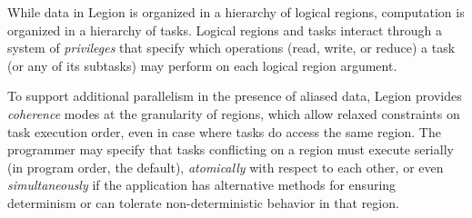 While data in Legion is organized in a hierarchy of logical regions,
computation is organized in a hierarchy of tasks.  Logical regions and tasks interact
through a system of {\em privileges} that specify which operations (read, write, or reduce)
a task (or any of its subtasks) may perform on each logical region argument.  


To support additional parallelism in the presence of aliased data,
Legion provides {\em coherence} modes at the granularity of regions,
which allow relaxed constraints on task execution order, even
in case where tasks do access the same region.  The programmer may
specify that tasks conflicting on a region must execute serially (in
program order, the default), {\em atomically} with respect to each
other, or even {\em simultaneously} if the application has alternative
methods for ensuring determinism or can tolerate non-deterministic
behavior in that region.

